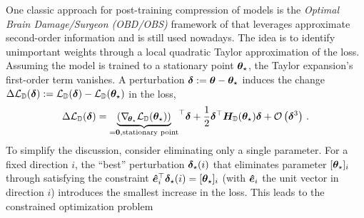 One classic approach for post-training compression of models is the
\emph{Optimal Brain Damage/Surgeon (OBD/OBS)} framework of
\citet{lecun1889optimal,hassibi1992second} that leverages approximate
second-order information and is still used
nowadays\cite{dong2017learning,theis2018faster,zeng2018mlprune,singh2020woodfisher}.
The idea is to identify unimportant weights through a local quadratic Taylor
approximation of the loss. Assuming the model is trained to a stationary point
${\bm{\theta}}_{\star}$, the Taylor expansion's first-order term vanishes. A
perturbation ${\bm{\delta}} := {\bm{\theta}} - {\bm{\theta}}_{\star}$ induces the change
$\Delta{\mathcal{L}}_{{\mathbb{D}}}({\bm{\delta}}) := {\mathcal{L}}_{{\mathbb{D}}}({\bm{\delta}}) - {\mathcal{L}}_{{\mathbb{D}}}({\bm{\theta}}_{\star}) $
in the loss,
\begin{align}\label{eq:background::InducedChangePerturbation}
  \Delta{\mathcal{L}}_{{\mathbb{D}}}({\bm{\delta}})
  =
  {\underbrace{\left(\nabla_{\!{{\bm{\theta}}_{\star}}}{\mathcal{L}}_{{\mathbb{D}}}({\bm{\theta}}_{\star})\right)}_{={\bm{0}}, \text{stationary point}}}^{\top}
  {\bm{\delta}}
  +
  \frac{1}{2}
  {{\bm{\delta}}}^{\top}
  {\bm{H}}_{{\mathbb{D}}}({\bm{\theta}}_{\star})
  {\bm{\delta}}
  +
  {\mathcal{O}}\left( {{\bm{\delta}}}^3\right)\,.
\end{align}
To simplify the discussion, consider eliminating only a single parameter.
For a fixed direction $i$, the ``best'' perturbation ${\bm{\delta}}_{\star}(i)$ that eliminates parameter
$[{\bm{\theta}}_{\star}]_i$ through satisfying the constraint $\bm{\hat{e}}_i^{\top}
{\bm{\delta}}_{\star}(i) = [{\bm{\theta}}_{\star}]_i$ (with $\bm{\hat{e}}_i$ the unit vector in
direction $i$) introduces the smallest increase in the loss. This leads to the
constrained optimization problem %
